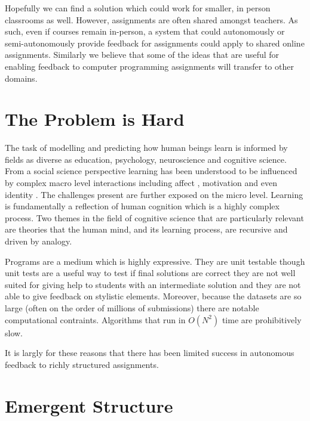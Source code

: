 Hopefully we can find a solution which could work for smaller, in person classrooms as well. However, assignments are often shared amongst teachers. As such, even if courses remain in-person, a system that could autonomously or semi-autonomously provide feedback for assignments could apply to shared online assignments. Similarly we believe that some of the ideas that are useful for enabling feedback to computer programming assignments will transfer to other domains.	

\section{The Problem is Hard}

The task of modelling and predicting how human beings learn is informed by fields as diverse
as education, psychology, neuroscience and cognitive science. From a social science perspective
learning has been understood to be influenced by complex macro level interactions including affect \cite{}
, motivation \cite{} and even identity \cite{}. The challenges present are further exposed on the micro
level. Learning is fundamentally a reflection of human cognition which is a highly complex process.
Two themes in the field of cognitive science that are particularly relevant are theories that the human
mind, and its learning process, are recursive and driven by analogy.

Programs are a medium which is highly expressive. They are unit testable though unit tests are a useful way to test if final solutions are correct they are not well suited for giving help to students with an intermediate solution and they are not able to give feedback on stylistic elements. Moreover, because the datasets are so large (often on the order of millions of submissions) there are notable computational contraints. Algorithms that run in $O(N^2)$ time are prohibitively slow.

It is largly for these reasons that there has been limited success in autonomous feedback to richly structured assignments.

\section{Emergent Structure}

